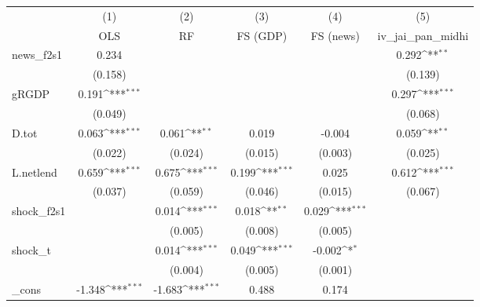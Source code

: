 {
\def\sym#1{\ifmmode^{#1}\else\(^{#1}\)\fi}
\begin{tabular}{l*{5}{c}}
\toprule
            &\multicolumn{1}{c}{(1)}&\multicolumn{1}{c}{(2)}&\multicolumn{1}{c}{(3)}&\multicolumn{1}{c}{(4)}&\multicolumn{1}{c}{(5)}\\
            &\multicolumn{1}{c}{OLS}&\multicolumn{1}{c}{RF}&\multicolumn{1}{c}{FS (GDP)}&\multicolumn{1}{c}{FS (news)}&\multicolumn{1}{c}{iv\_jai\_pan\_midhi}\\
\midrule
news\_f2s1   &       0.234         &                     &                     &                     &       0.292\sym{**} \\
            &     (0.158)         &                     &                     &                     &     (0.139)         \\
\addlinespace
gRGDP       &       0.191\sym{***}&                     &                     &                     &       0.297\sym{***}\\
            &     (0.049)         &                     &                     &                     &     (0.068)         \\
\addlinespace
D.tot       &       0.063\sym{***}&       0.061\sym{**} &       0.019         &      -0.004         &       0.059\sym{**} \\
            &     (0.022)         &     (0.024)         &     (0.015)         &     (0.003)         &     (0.025)         \\
\addlinespace
L.netlend   &       0.659\sym{***}&       0.675\sym{***}&       0.199\sym{***}&       0.025         &       0.612\sym{***}\\
            &     (0.037)         &     (0.059)         &     (0.046)         &     (0.015)         &     (0.067)         \\
\addlinespace
shock\_f2s1  &                     &       0.014\sym{***}&       0.018\sym{**} &       0.029\sym{***}&                     \\
            &                     &     (0.005)         &     (0.008)         &     (0.005)         &                     \\
\addlinespace
shock\_t     &                     &       0.014\sym{***}&       0.049\sym{***}&      -0.002\sym{*}  &                     \\
            &                     &     (0.004)         &     (0.005)         &     (0.001)         &                     \\
\addlinespace
\_cons      &      -1.348\sym{***}&      -1.683\sym{***}&       0.488         &       0.174         &                     \\

\end{tabular}}
